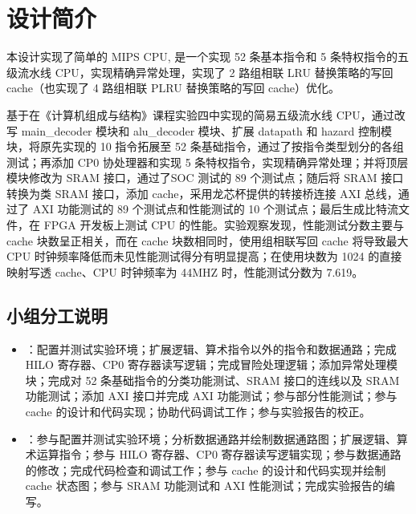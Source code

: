 \section{设计简介}
本设计实现了简单的 MIPS CPU, 是一个实现 52 条基本指令和 5 条特权指令的五级流水线 CPU，实现精确异常处理，实现了 2 路组相联 LRU 替换策略的写回 cache（也实现了 4 路组相联 PLRU 替换策略的写回 cache）优化。

基于在《计算机组成与结构》课程实验四中实现的简易五级流水线 CPU，通过改写 main\_decoder 模块和 alu\_decoder 模块、扩展 datapath 和 hazard 控制模块，将原先实现的 10 指令拓展至 52 条基础指令，通过了按指令类型划分的各组测试；再添加 CP0 协处理器和实现 5 条特权指令，实现精确异常处理；并将顶层模块修改为 SRAM 接口，通过了SOC 测试的 89 个测试点；随后将 SRAM 接口转换为类 SRAM 接口，添加 cache，采用龙芯杯提供的转接桥连接 AXI 总线，通过了 AXI 功能测试的 89 个测试点和性能测试的 10 个测试点；最后生成比特流文件，在 FPGA 开发板上测试 CPU 的性能。实验观察发现，性能测试分数主要与 cache 块数呈正相关，而在 cache 块数相同时，使用组相联写回 cache 将导致最大 CPU 时钟频率降低而未见性能测试得分有明显提高；在使用块数为 1024 的直接映射写透 cache、CPU 时钟频率为 44MHZ 时，性能测试分数为 7.619。

\subsection{小组分工说明}

\begin{itemize}
    \item \stunamea：配置并测试实验环境；扩展逻辑、算术指令以外的指令和数据通路；完成 HILO 寄存器、CP0 寄存器读写逻辑；完成冒险处理逻辑；添加异常处理模块；完成对 52 条基础指令的分类功能测试、SRAM 接口的连线以及 SRAM 功能测试；添加 AXI 接口并完成 AXI 功能测试；参与部分性能测试；参与 cache 的设计和代码实现；协助代码调试工作；参与实验报告的校正。
    \item \stunameb：参与配置并测试实验环境；分析数据通路并绘制数据通路图；扩展逻辑、算术运算指令；参与 HILO 寄存器、CP0 寄存器读写逻辑实现；参与数据通路的修改；完成代码检查和调试工作；参与 cache 的设计和代码实现并绘制 cache 状态图；参与 SRAM 功能测试和 AXI 性能测试；完成实验报告的编写。
\end{itemize}
